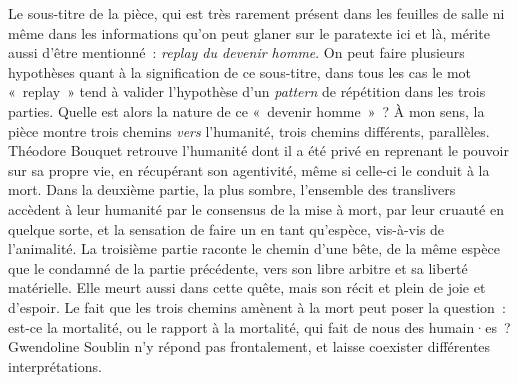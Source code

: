 \documentclass[
]{article}
\begin{document}
Le sous-titre de la pièce, qui est très rarement présent dans les feuilles de salle ni même dans les informations qu'on peut glaner sur le paratexte ici et là, mérite aussi d'être mentionné~: \emph{replay du devenir homme}. On peut faire plusieurs hypothèses quant à la signification de ce sous-titre, dans tous les cas le mot «~replay~» tend à valider l'hypothèse d'un \emph{pattern} de répétition dans les trois parties. Quelle est alors la nature de ce «~devenir homme~»~? À mon sens, la pièce montre trois chemins \emph{vers }l'humanité, trois chemins différents, parallèles. Théodore Bouquet retrouve l'humanité dont il a été privé en reprenant le pouvoir sur sa propre vie, en récupérant son agentivité, même si celle-ci le conduit à la mort. Dans la deuxième partie, la plus sombre, l'ensemble des translivers accèdent à leur humanité par le consensus de la mise à mort, par leur cruauté en quelque sorte, et la sensation de faire un en tant qu'espèce, vis-à-vis de l'animalité. La troisième partie raconte le chemin d'une bête, de la même espèce que le condamné de la partie précédente, vers son libre arbitre et sa liberté matérielle. Elle meurt aussi dans cette quête, mais son récit et plein de joie et d'espoir. Le fait que les trois chemins amènent à la mort peut poser la question~: est-ce la mortalité, ou le rapport à la mortalité, qui fait de nous des humain·es~? Gwendoline Soublin n'y répond pas frontalement, et laisse coexister différentes interprétations.
\end{document}
